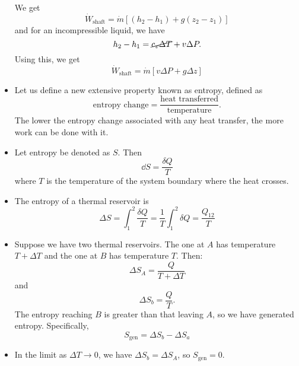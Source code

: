 \begin{itemize}
\begin{example}
        We get 
        \begin{equation}
            \dot{W}_\text{shaft} = \dot{m}[(h_2-h_1)+g(z_2-z_1)]
        \end{equation}
        and for an incompressible liquid, we have 
        \begin{equation}
            h_2-h_1=\cancel{c_v\Delta T}+v\Delta P.
        \end{equation}
        Using this, we get 
        \begin{equation}
            \dot{W}_\text{shaft} = \dot{m}[v\Delta P + g\Delta z]
        \end{equation}
    \end{example}
    \item Let us define a new extensive property known as entropy, defined as 
    \begin{equation}
        \text{entropy change} = \frac{\text{heat transferred}}{\text{temperature}}.
    \end{equation}
    The lower the entropy change associated with any heat transfer, the more work can be done with it.
    \item Let entropy be denoted as $S$. Then 
    \begin{equation}
        \dd{S} = \frac{\delta Q}{T}
    \end{equation}
    where $T$ is the temperature of the system boundary where the heat crosses.
    \item The entropy of a thermal reservoir is 
    \begin{equation}
        \Delta S = \int_1^2 \frac{\delta Q}{T} = \frac{1}{T}\int_1^2 \delta Q = \frac{Q_{12}}{T}
    \end{equation}
    \item Suppose we have two thermal reservoirs. The one at $A$ has temperature $T+\Delta T$ and the one at $B$ has temperature $T$. Then: 
    \begin{equation}
        \Delta S_A = \frac{Q}{T+\Delta T}
    \end{equation}
    and 
    \begin{equation}
        \Delta S_b = \frac{Q}{T}.
    \end{equation}
    The entropy reaching $B$ is greater than that leaving $A$, so we have generated entropy. Specifically,
    \begin{equation}
        S_\text{gen} =\Delta S_b - \Delta S_a
    \end{equation}
    \item In the limit as $\Delta T\rightarrow 0$, we have $\Delta S_b=\Delta S_A$, so $S_\text{gen}=0$.

\end{itemize}
